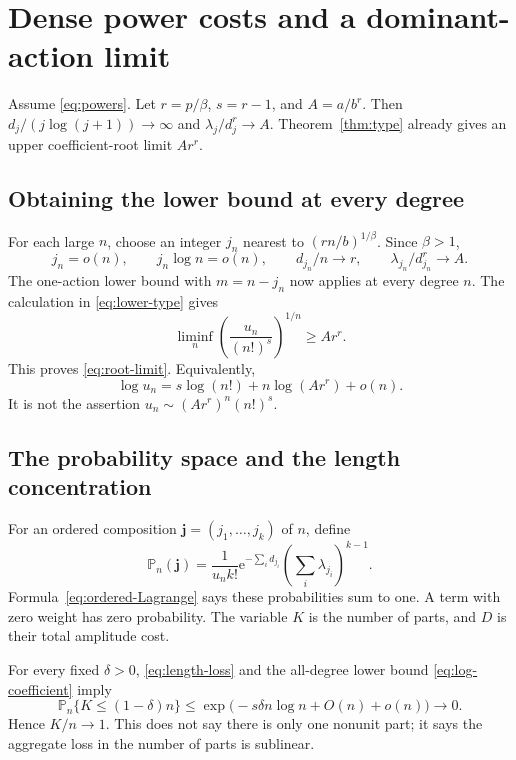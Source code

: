 \documentclass[11pt,a4paper]{article}
\numberwithin{equation}{section}
\theoremstyle{definition}
\theoremstyle{remark}
\theoremstyle{definition}
\newcommand{\e}{\mathrm e}
\begin{document}
\section{Dense power costs and a dominant-action limit}
\label{sec:condensation}

Assume \eqref{eq:powers}. Let $r=p/\beta$, $s=r-1$, and
$A=a/b^r$. Then $d_j/(j\log(j+1))\to\infty$ and
$\lambda_j/d_j^r\to A$. Theorem~\ref{thm:type} already gives an upper
coefficient-root limit $Ar^r$.

\subsection{Obtaining the lower bound at every degree}
For each large $n$, choose an integer $j_n$ nearest to
$(rn/b)^{1/\beta}$. Since $\beta>1$,
\[
 j_n=o(n),\qquad j_n\log n=o(n),\qquad
 d_{j_n}/n\to r,\qquad \lambda_{j_n}/d_{j_n}^r\to A.
\]
The one-action lower bound with $m=n-j_n$ now applies at every degree
$n$. The calculation in \eqref{eq:lower-type} gives
\[
 \liminf_n\left(\frac{u_n}{(n!)^s}\right)^{1/n}\ge Ar^r.
\]
This proves \eqref{eq:root-limit}. Equivalently,
\begin{equation}
 \log u_n=s\log(n!)+n\log(Ar^r)+o(n).
 \label{eq:log-coefficient}
\end{equation}
It is not the assertion $u_n\sim(Ar^r)^n(n!)^s$.

\subsection{The probability space and the length concentration}
For an ordered composition $\mathbf j=(j_1,\ldots,j_k)$ of $n$, define
\begin{equation}
 \mathbb P_n(\mathbf j)=\frac{1}{u_n k!}
       \e^{-\sum_i d_{j_i}}
       \left(\sum_i\lambda_{j_i}\right)^{k-1}.
 \label{eq:probability}
\end{equation}
Formula~\eqref{eq:ordered-Lagrange} says these probabilities sum to one.
A term with zero weight has zero probability. The variable $K$ is the
number of parts, and $D$ is their total amplitude cost.

For every fixed $\delta>0$, \eqref{eq:length-loss} and the all-degree
lower bound \eqref{eq:log-coefficient} imply
\begin{equation}
 \mathbb P_n\{K\le(1-\delta)n\}
 \le\exp\bigl(-s\delta n\log n+O(n)+o(n)\bigr)\longrightarrow0.
 \label{eq:length-concentration}
\end{equation}
Hence $K/n\to1$. This does not say there is only one nonunit part;
it says the aggregate loss in the number of parts is sublinear.
\end{document}
